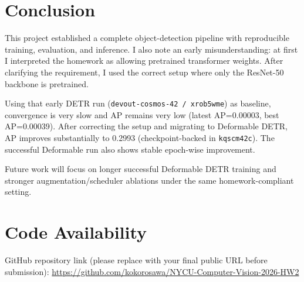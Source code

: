 \section{Conclusion}
This project established a complete object-detection pipeline with reproducible training, evaluation, and inference.
I also note an early misunderstanding: at first I interpreted the homework as allowing pretrained transformer weights.
After clarifying the requirement, I used the correct setup where only the ResNet-50 backbone is pretrained.

Using that early DETR run (\texttt{devout-cosmos-42 / xrob5wme}) as baseline, convergence is very slow and AP remains very low (latest AP=0.00003, best AP=0.00039).
After correcting the setup and migrating to Deformable DETR, AP improves substantially to 0.2993 (checkpoint-backed in \texttt{kqscm42c}).
The successful Deformable run also shows stable epoch-wise improvement.

Future work will focus on longer successful Deformable DETR training and stronger augmentation/scheduler ablations under the same homework-compliant setting.

\section{Code Availability}
GitHub repository link (please replace with your final public URL before submission):
\url{https://github.com/kokorosawa/NYCU-Computer-Vision-2026-HW2}
